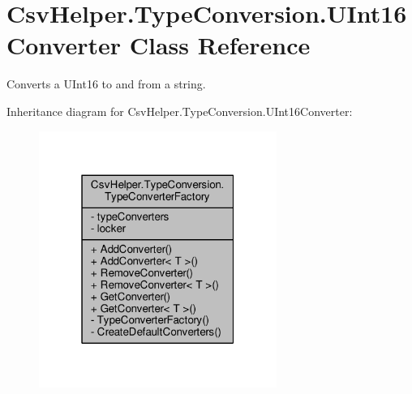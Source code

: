 \hypertarget{a00172}{\section{Csv\-Helper.\-Type\-Conversion.\-U\-Int16\-Converter Class Reference}
\label{a00172}
}


Converts a U\-Int16 to and from a string.  




Inheritance diagram for Csv\-Helper.\-Type\-Conversion.\-U\-Int16\-Converter\-:
\nopagebreak
\begin{figure}[H]
\begin{center}
\leavevmode
\includegraphics[width=220pt]{a00560}
\end{center}
\end{figure}


